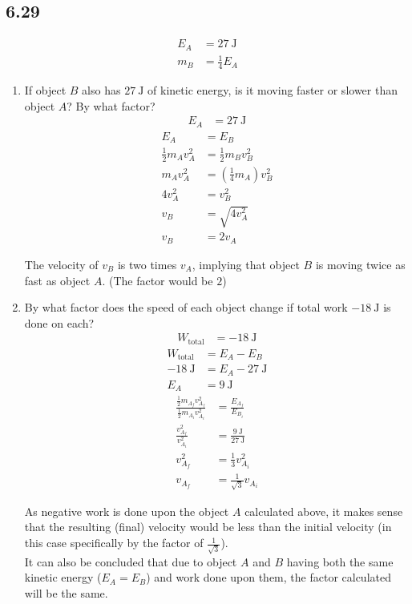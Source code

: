 \documentclass{article}
\begin{document}
\subsection{6.29}

\begin{align*}
	E_A & = \SI{27}{\joule} \\
	m_B & = \frac{1}{4}E_A
\end{align*}
\begin{enumerate}[label = \textbf{(\alph*)}]
	\item If object $ B $ also has $ \SI{27}{\joule} $ of kinetic energy, is it moving faster or slower than object $ A $? By what factor?
		\begin{align*}
			E_A & = \SI{27}{\joule}
		\end{align*}
		\begin{align*}
			E_A & = E_B \\
			\frac{1}{2}m_Av_A^2 & = \frac{1}{2}m_Bv_B^2 \\
			m_Av_A^2 & = \left( \frac{1}{4}m_A \right)v_B^2 \\
			4v_A^2 & = v_B^2 \\
			v_B & = \sqrt{4v_A^2} \\
			v_B & = 2v_A
		\end{align*}
		\begin{mdframed}
			The velocity of $ v_B $ is two times $ v_A $, implying that object $ B $ is moving twice as fast as object $ A $. (The factor would be $ 2 $)
		\end{mdframed}
	\item By what factor does the speed of each object change if total work $ \SI{-18}{\joule} $ is done on each?
		\begin{align*}
			W_\text{total} & = \SI{-18}{\joule}
		\end{align*}
		\begin{align*}
			W_\text{total} & = E_A - E_B \\
			\SI{-18}{\joule} & = E_A - \SI{27}{\joule} \\
			E_A & = \SI{9}{\joule}
		\end{align*}
		\begin{align*}
			\frac{ \frac{1}{2}m_{A_f}v_{A_f}^2 }{ \frac{1}{2}m_{A_i}v_{A_i}^2 } & = \frac{E_{A_f}}{E_{B_i}} \\
			\frac{v_{A_f}^2}{v_{A_i}^2} & = \frac{\SI{9}{\joule}}{\SI{27}{\joule}} \\
			v_{A_f}^2 & = \frac{1}{3}v_{A_i}^2 \\
			v_{A_f} & = \frac{1}{\sqrt{3}}v_{A_i}
		\end{align*}
		\begin{mdframed}
		As negative work is done upon the object $ A $ calculated above, it makes sense that the resulting (final) velocity would be less than the initial velocity (in this case specifically by the factor of $ \frac{1}{\sqrt{3}} $). \\
		It can also be concluded that due to object $ A $ and $ B $ having both the same kinetic energy ($ E_A = E_B $) and work done upon them, the factor calculated will be the same.
		\end{mdframed}
\end{enumerate}
\end{document}
